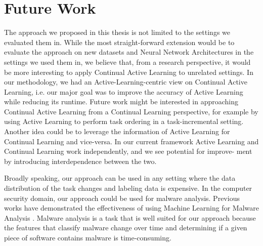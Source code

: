 \section{Future Work}
\label{sec:Conclusion:FutureWork}
The approach we proposed in this thesis is not limited to the settings we evaluated them in. While the most straight-forward extension would be to evaluate the approach
on new datasets and Neural Network Architectures in the settings we used them in, we believe that, from a research perspective, it would be more interesting to apply 
Continual Active Learning to unrelated settings. In our methodology, we had an Active-Learning-centric view on Continual Active Learning, i.e. our major goal was to
improve the accuracy of Active Learning while reducing its runtime. Future work might be interested in approaching Continual Active Learning from a Continual Learning
perspective, for example by using Active Learning to perform task ordering in a task-incremental setting. Another idea could be to leverage the information of Active
Learning for Continual Learning and vice-versa. In our current framework Active Learning and Continual Learning work independently, and we see potential for improve-
ment by introducing interdependence between the two. \par
Broadly speaking, our approach can be used in any setting where the data distribution of the task changes and labeling data is expensive. In the computer security domain,
our approach could be used for malware analysis. Previous works have demonstrated the effectiveness of using Machine Learning for Malware Analysis \cite{nath2014static}
\cite{ijaz2019static}. Malware analysis is a task that is well suited for our approach because the features that classify malware change over time and determining if a
given piece of software contains malware is time-consuming. 